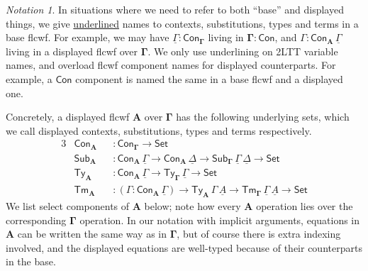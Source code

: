 \documentclass[12pt,a4paper,twoside,openany]{book}
\theoremstyle{remark}
\newtheorem{notation}{Notation}
\theoremstyle{definition}
\theoremstyle{theorem}
\newcommand{\bs}[1]{\boldsymbol{#1}}
\newcommand{\Con}{\mathsf{Con}}
\newcommand{\Sub}{\mathsf{Sub}}
\newcommand{\Tm}{\mathsf{Tm}}
\newcommand{\Ty}{\mathsf{Ty}}
\newcommand{\ra}{\rightarrow}
\newcommand{\Set}{\mathsf{Set}}
\newcommand{\bGamma}{\bs{\Gamma}}
\newcommand{\bA}{\bs{A}}
\newcommand{\ul}[1]{\underline{#1}}
\newcommand{\ulGamma}{\ul{\Gamma}}
\newcommand{\ulDelta}{\ul{\Delta}}
\newcommand{\ulA}{\ul{A}}
\begin{document}
\begin{notation} In situations where we need to refer to both ``base'' and
displayed things, we give \ul{underlined} names to contexts, substitutions,
types and terms in a base flcwf. For example, we may have $\ulGamma :
\Con_{\bGamma}$ living in $\bs{\Gamma : \Con}$, and $\Gamma :
\Con_{\bA}\,\ulGamma$ living in a displayed flcwf over $\bGamma$. We only use
underlining on 2LTT variable names, and overload flcwf component names for
displayed counterparts. For example, a $\Con$ component is named the same in
a base flcwf and a displayed one.
\end{notation}

Concretely, a displayed flcwf $\bA$ over $\bGamma$ has the following underlying
sets, which we call displayed contexts, substitutions, types and terms
respectively.
\begin{alignat*}{3}
  & \Con_{\bA} && : \Con_{\bGamma}\ra \Set\\
  & \Sub_{\bA} && : \Con_{\bA}\,\ulGamma \ra \Con_{\bA}\,\ulDelta \ra \Sub_{\bGamma}\,\ulGamma\,\ulDelta \ra \Set \\
  & \Ty_{\bA}  && : \Con_{\bA}\,\ulGamma \ra \Ty_{\bGamma}\,\ulGamma \ra \Set\\
  & \Tm_{\bA}  && : (\Gamma : \Con_{\bA}\,\ulGamma)\ra \Ty_{\bA}\,\Gamma\,\ulA \ra \Tm_{\bGamma}\,\ulGamma\,\ulA \ra \Set
\end{alignat*}
We list select components of $\bA$ below; note how every $\bA$ operation lies
over the corresponding $\bGamma$ operation. In our notation with implicit
arguments, equations in $\bA$ can be written the same way as in $\bGamma$, but
of course there is extra indexing involved, and the displayed equations are
well-typed because of their counterparts in the base.
\end{document}
